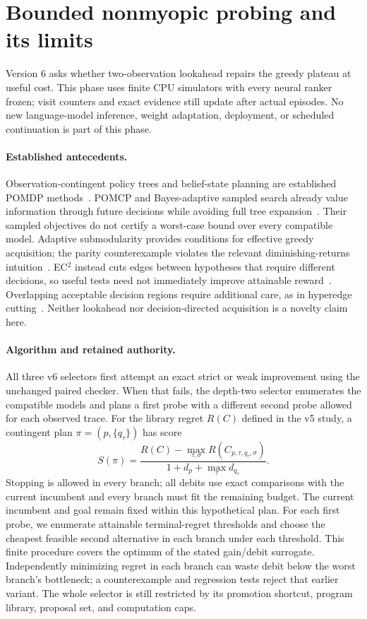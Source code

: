 \section{Bounded nonmyopic probing and its limits}
\label{sec:v6}
Version 6 asks whether two-observation lookahead repairs the greedy plateau at
useful cost. This phase uses finite CPU simulators with every neural ranker
frozen; visit counters and exact evidence still update after actual episodes.
No new language-model inference, weight adaptation, deployment, or scheduled
continuation is part of this phase.

\paragraph{Established antecedents.}
Observation-contingent policy trees and belief-state planning are established
POMDP methods~\cite{pomdp}. POMCP and Bayes-adaptive sampled search already value
information through future decisions while avoiding full tree
expansion~\cite{pomcp,bamcp}. Their sampled objectives do not certify a worst-case
bound over every compatible model. Adaptive submodularity provides conditions
for effective greedy acquisition; the parity counterexample violates the
relevant diminishing-returns intuition~\cite{adaptivesubmod}. EC$^2$ instead cuts
edges between hypotheses that require different decisions, so useful tests need
not immediately improve attainable reward~\cite{ec2}. Overlapping acceptable
decision regions require additional care, as in hyperedge cutting~\cite{hec}.
Neither lookahead nor decision-directed acquisition is a novelty claim here.

\paragraph{Algorithm and retained authority.}
All three v6 selectors first attempt an exact strict or weak improvement using
the unchanged paired checker. When that fails, the depth-two selector enumerates
the compatible models and plans a first probe with a different second probe
allowed for each observed trace. For the library regret $R(C)$ defined in the v5
study, a contingent plan $\pi=(p,\{q_\tau\})$ has score
\[
 S(\pi)=\frac{R(C)-\max_{\tau,\sigma}R(C_{p,\tau,q_\tau,\sigma})}
 {1+d_p+\max_\tau d_{q_\tau}}.
\]
Stopping is allowed in every branch; all debits use exact comparisons with the
current incumbent and every branch must fit the remaining budget. The current
incumbent and goal remain fixed within this hypothetical plan. For each first
probe, we enumerate attainable terminal-regret thresholds and choose the cheapest
feasible second alternative in each branch under each threshold. This finite
procedure covers the optimum of the stated gain/debit surrogate. Independently
minimizing regret in each branch can waste debit below the worst branch's
bottleneck; a counterexample and regression tests reject that earlier variant.
The whole selector is still restricted by its promotion shortcut, program
library, proposal set, and computation caps.

